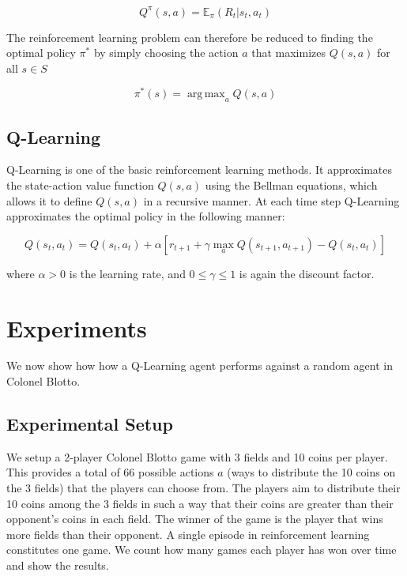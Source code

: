 \documentclass[11pt, oneside]{article}   	%
\DeclareMathOperator*{\argmax}{arg\,max}
\begin{document}
\begin{equation}
Q^\pi(s,a) = \mathbb{E}_\pi(R_t | s_t, a_t)
\end{equation}

The reinforcement learning problem can therefore be reduced to finding the optimal policy $\pi^*$ by simply choosing the action $a$ that maximizes $Q(s,a)$ for all $s \in S$ 

\begin{equation}
\pi^*(s) = \argmax_a{Q(s,a)}
\end{equation}
\subsection{Q-Learning}

Q-Learning is one of the basic reinforcement learning methods. It approximates the state-action value function $Q(s,a)$ using the Bellman equations, which allows it to define $Q(s,a)$ in a recursive manner. At each time step Q-Learning approximates the optimal policy in the following manner:

\begin{equation}
Q(s_t, a_t) = Q(s_t, a_t) + \alpha[r_{t+1} + \gamma \max_aQ(s_{t+1}, a_{t+1}) - Q(s_t, a_t)]
\end{equation}

where $\alpha > 0$ is the learning rate, and $0 \leq \gamma \leq 1$ is again the discount factor.

\section{Experiments}

We now show how how a Q-Learning agent performs against a random agent in Colonel Blotto.

\subsection{Experimental Setup}

We setup a 2-player Colonel Blotto game with 3 fields and 10 coins per player. This provides a total of 66 possible actions $a$ (ways to distribute the 10 coins on the 3 fields) that the players can choose from. The players aim to distribute their 10 coins among the 3 fields in such a way that their coins are greater than their opponent's coins in each field. The winner of the game is the player that wins more fields than their opponent. A single episode in reinforcement learning constitutes one game. We count how many games each player has won over time and show the results.
\end{document}
